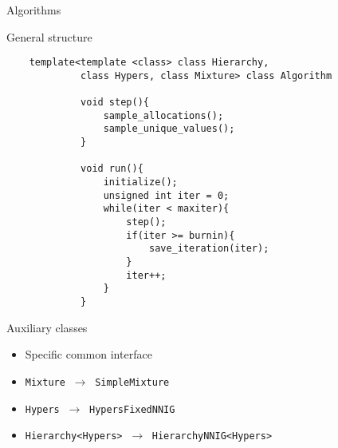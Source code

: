 \begin{frame}[c] %
	\begin{center}
		\huge \color{blue} Algorithms
	\end{center}
\end{frame}


\begin{frame}[fragile]{General structure} %
	\small
	\begin{verbatim}
    template<template <class> class Hierarchy,
             class Hypers, class Mixture> class Algorithm
            
             void step(){
                 sample_allocations();
                 sample_unique_values();
             }

             void run(){
                 initialize();
                 unsigned int iter = 0;
                 while(iter < maxiter){
                     step();
                     if(iter >= burnin){
                         save_iteration(iter);
                     }
                     iter++;
                 }
             }
	\end{verbatim}
\end{frame}


\begin{frame}{Auxiliary classes} %
	\begin{itemize}
		\item Specific common interface
		\item \texttt{Mixture} $\ \to \ $ \texttt{SimpleMixture}
		\item \texttt{Hypers} $\ \to \ $ \texttt{HypersFixedNNIG}
		\item \texttt{Hierarchy<Hypers>} $\ \to \ $ \texttt{HierarchyNNIG<Hypers>}
	\end{itemize}
\end{frame}


